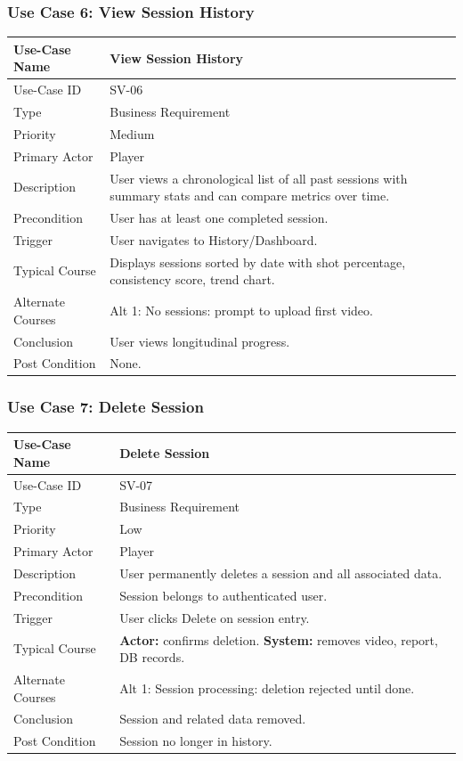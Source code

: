 ﻿\documentclass[11pt,a4paper]{article}
\begin{document}
\subsubsection*{Use Case 6: View Session History}
\begin{longtable}{|L{3.5cm}|L{11cm}|}
\hline
Use-Case Name & View Session History \\ \hline
Use-Case ID & SV-06 \\ \hline
Type & Business Requirement \\ \hline
Priority & Medium \\ \hline
Primary Actor & Player \\ \hline
Description & User views a chronological list of all past sessions with summary stats and can compare metrics over time. \\ \hline
Precondition & User has at least one completed session. \\ \hline
Trigger & User navigates to History/Dashboard. \\ \hline
Typical Course & Displays sessions sorted by date with shot percentage, consistency score, trend chart. \\ \hline
Alternate Courses & Alt 1: No sessions: prompt to upload first video. \\ \hline
Conclusion & User views longitudinal progress. \\ \hline
Post Condition & None. \\ \hline
\end{longtable}

\subsubsection*{Use Case 7: Delete Session}
\begin{longtable}{|L{3.5cm}|L{11cm}|}
\hline
Use-Case Name & Delete Session \\ \hline
Use-Case ID & SV-07 \\ \hline
Type & Business Requirement \\ \hline
Priority & Low \\ \hline
Primary Actor & Player \\ \hline
Description & User permanently deletes a session and all associated data. \\ \hline
Precondition & Session belongs to authenticated user. \\ \hline
Trigger & User clicks Delete on session entry. \\ \hline
Typical Course & \textbf{Actor:} confirms deletion. \textbf{System:} removes video, report, DB records. \\ \hline
Alternate Courses & Alt 1: Session processing: deletion rejected until done. \\ \hline
Conclusion & Session and related data removed. \\ \hline
Post Condition & Session no longer in history. \\ \hline
\end{longtable}
\end{document}
